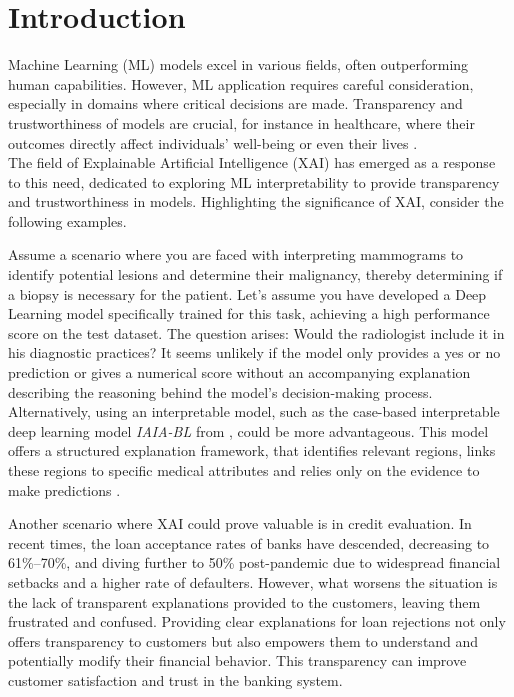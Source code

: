 
\section{Introduction}

Machine Learning (ML) models excel in various fields, often outperforming human capabilities. However, ML application requires careful consideration, especially in domains where critical decisions are made. Transparency and trustworthiness of models are crucial, for instance in healthcare, where their outcomes directly affect individuals' well-being or even their lives \cite{MARKUS2021103655}. \\
The field of Explainable Artificial Intelligence (XAI) has emerged as a response to this need, dedicated to exploring ML interpretability to provide transparency and trustworthiness in models. Highlighting the significance of XAI, consider the following examples.

Assume a scenario where you are faced with interpreting mammograms to identify potential lesions and determine their malignancy, thereby determining if a biopsy is necessary for the patient. Let's assume you have developed a Deep Learning model specifically trained for this task, achieving a high performance score on the test dataset.
The question arises: Would the radiologist include it in his diagnostic practices? It seems unlikely if the model only provides a yes or no prediction or gives a numerical score without an accompanying explanation describing the reasoning behind the model's decision-making process.
Alternatively, using an interpretable model, such as the case-based interpretable deep learning model \textit{IAIA-BL} from \cite{barnett2021case}, could be more advantageous. This model offers a structured explanation framework, that identifies relevant regions, links these regions to specific medical attributes and relies only on the evidence to make predictions \cite{barnett2021case}.

Another scenario where XAI could prove valuable is in credit evaluation. 
In recent times, the loan acceptance rates of banks have descended, decreasing to 61\%–70\%, and diving further to 50\% post-pandemic due to widespread financial setbacks and a higher rate of defaulters.
However, what worsens the situation is the lack of transparent explanations provided to the customers, leaving them frustrated and confused.
Providing clear explanations for loan rejections not only offers transparency to customers but also empowers them to understand and potentially modify their financial behavior. This transparency can improve customer satisfaction and trust in the banking system.
\cite{NALLAKARUPPAN2024111307}

